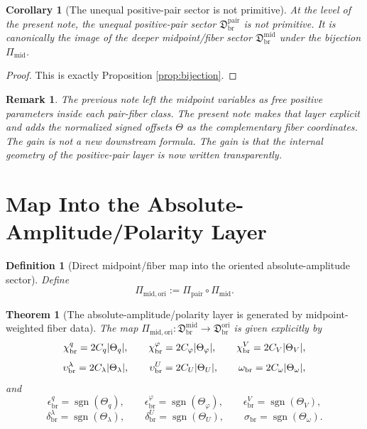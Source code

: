 \documentclass[11pt]{article}
\newcommand{\OriginSector}{\mathfrak D_{\mathrm{br}}^{\mathrm{ori}}}
\newcommand{\AbsReadAmp}{\chi_{\mathrm{br}}^{q}}
\newcommand{\AbsCovAmp}{\chi_{\mathrm{br}}^{\varphi}}
\newcommand{\AbsRelaxAmp}{\chi_{\mathrm{br}}^{V}}
\newcommand{\AbsWellAmp}{\upsilon_{\mathrm{br}}^{\lambda}}
\newcommand{\AbsEqAmp}{\upsilon_{\mathrm{br}}^{U}}
\newcommand{\AbsScaleAmp}{\omega_{\mathrm{br}}}
\newcommand{\PolRead}{\epsilon_{\mathrm{br}}^{q}}
\newcommand{\PolCov}{\epsilon_{\mathrm{br}}^{\varphi}}
\newcommand{\PolRelax}{\epsilon_{\mathrm{br}}^{V}}
\newcommand{\PolWell}{\delta_{\mathrm{br}}^{\lambda}}
\newcommand{\PolEq}{\delta_{\mathrm{br}}^{U}}
\newcommand{\PolScale}{\sigma_{\mathrm{br}}}
\newcommand{\PairSector}{\mathfrak D_{\mathrm{br}}^{\mathrm{pair}}}
\newcommand{\PairMap}{\Pi_{\mathrm{pair}}}
\newcommand{\MidFiberSector}{\mathfrak D_{\mathrm{br}}^{\mathrm{mid}}}
\newcommand{\MidPairMap}{\Pi_{\mathrm{mid}}}
\newcommand{\MidOriginMap}{\Pi_{\mathrm{mid,ori}}}
\newcommand{\MidRead}{C_{q}}
\newcommand{\MidCov}{C_{\varphi}}
\newcommand{\MidRelax}{C_{V}}
\newcommand{\MidWell}{C_{\lambda}}
\newcommand{\MidEq}{C_{U}}
\newcommand{\MidScale}{C_{\omega}}
\newcommand{\FiberRead}{\Theta_{q}}
\newcommand{\FiberCov}{\Theta_{\varphi}}
\newcommand{\FiberRelax}{\Theta_{V}}
\newcommand{\FiberWell}{\Theta_{\lambda}}
\newcommand{\FiberEq}{\Theta_{U}}
\newcommand{\FiberScale}{\Theta_{\omega}}
\newtheorem{definition}{Definition}
\newtheorem{remark}{Remark}
\newtheorem{corollary}{Corollary}
\newtheorem{theorem}{Theorem}
\begin{document}
\begin{corollary}[The unequal positive-pair sector is not primitive]
\label{cor:notprimitive}
At the level of the present note, the unequal positive-pair sector \(\PairSector\) is not primitive. It is canonically the image of the deeper midpoint/fiber sector \(\MidFiberSector\) under the bijection \(\MidPairMap\).
\end{corollary}

\begin{proof}
This is exactly Proposition \ref{prop:bijection}.
\end{proof}

\begin{remark}
The previous note left the midpoint variables as free positive parameters inside each pair-fiber class. The present note makes that layer explicit and adds the normalized signed offsets \(\Theta\) as the complementary fiber coordinates. The gain is not a new downstream formula. The gain is that the internal geometry of the positive-pair layer is now written transparently.
\end{remark}

\section{Map Into the Absolute-Amplitude/Polarity Layer}

\begin{definition}[Direct midpoint/fiber map into the oriented absolute-amplitude sector]
\label{def:midorigin}
Define
\begin{equation}
\MidOriginMap:=\PairMap\circ\MidPairMap.
\label{eq:midorigin}
\end{equation}
\end{definition}

\begin{theorem}[The absolute-amplitude/polarity layer is generated by midpoint-weighted fiber data]
\label{thm:midorigin}
The map \(\MidOriginMap:\MidFiberSector\to\OriginSector\) is given explicitly by
\begin{equation}
\AbsReadAmp=2\MidRead\abs{\FiberRead},
\qquad
\AbsCovAmp=2\MidCov\abs{\FiberCov},
\qquad
\AbsRelaxAmp=2\MidRelax\abs{\FiberRelax},
\label{eq:midoriginA}
\end{equation}
\begin{equation}
\AbsWellAmp=2\MidWell\abs{\FiberWell},
\qquad
\AbsEqAmp=2\MidEq\abs{\FiberEq},
\qquad
\AbsScaleAmp=2\MidScale\abs{\FiberScale},
\label{eq:midoriginB}
\end{equation}
and
\begin{equation}
\PolRead=\operatorname{sgn}(\FiberRead),
\qquad
\PolCov=\operatorname{sgn}(\FiberCov),
\qquad
\PolRelax=\operatorname{sgn}(\FiberRelax),
\label{eq:midoriginC}
\end{equation}
\begin{equation}
\PolWell=\operatorname{sgn}(\FiberWell),
\qquad
\PolEq=\operatorname{sgn}(\FiberEq),
\qquad
\PolScale=\operatorname{sgn}(\FiberScale).
\label{eq:midoriginD}
\end{equation}
\end{theorem}
\end{document}
